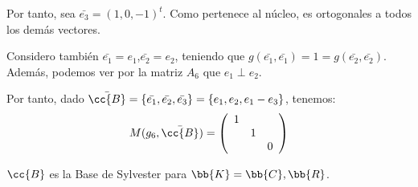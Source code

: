 \begin{ejercicio}
\begin{enumerate}
\begin{enumerate}
            Por tanto, sea $\bar{e_3}=(1,0,-1)^t$. Como pertenece al núcleo, es ortogonales a todos los demás vectores.
            
            Considero también $\bar{e_1}=e_1$,$\bar{e_2}=e_2$, teniendo que $g(\bar{e_1},\bar{e_1}) = 1 = g(\bar{e_2},\bar{e_2})$. Además, podemos ver por la matriz $A_6$ que $e_1\perp e_2$.
            
            Por tanto, dado $\Bar{\cc{B}}=\{\bar{e_1},\bar{e_2},\bar{e_3}\} = \{e_1, e_2, e_1-e_3\}$, tenemos:
            \begin{equation*}
                M(g_6, \Bar{\cc{B}}) = \left(\begin{array}{ccc}
                    1 &  &  \\
                     & 1 &  \\
                     &  & 0 \\
                \end{array} \right)
            \end{equation*}

            $\cc{B}$ es la Base de Sylvester para $\bb{K}=\bb{C},\bb{R}$.
            
        \end{enumerate}
    \end{enumerate}
\end{ejercicio}

